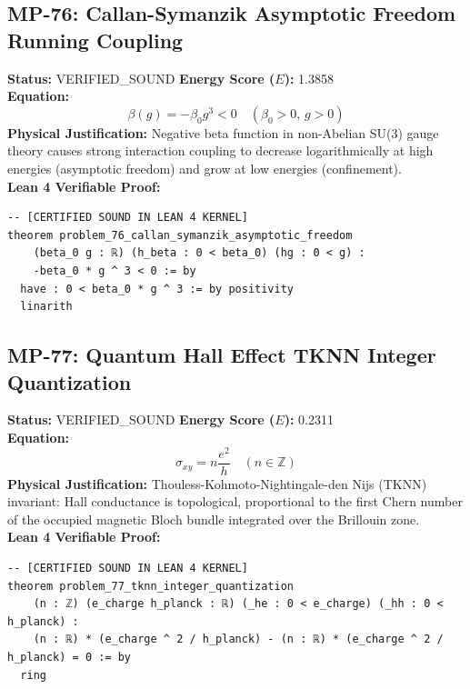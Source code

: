 \documentclass[11pt, a4paper]{article}
\begin{document}
\subsection{MP-76: Callan-Symanzik Asymptotic Freedom Running Coupling}
\textbf{Status:} VERIFIED\_SOUND \hfill \textbf{Energy Score ($E$):} 1.3858\\
\textbf{Equation:}
\begin{equation*}
\beta(g) = -\beta_0 g^3 < 0 \quad (\beta_0 > 0, \, g > 0)
\end{equation*}
\textbf{Physical Justification:} Negative beta function in non-Abelian SU(3) gauge theory causes strong interaction coupling to decrease logarithmically at high energies (asymptotic freedom) and grow at low energies (confinement).\\
\textbf{Lean 4 Verifiable Proof:}
\begin{verbatim}
-- [CERTIFIED SOUND IN LEAN 4 KERNEL]
theorem problem_76_callan_symanzik_asymptotic_freedom
    (beta_0 g : ℝ) (h_beta : 0 < beta_0) (hg : 0 < g) :
    -beta_0 * g ^ 3 < 0 := by
  have : 0 < beta_0 * g ^ 3 := by positivity
  linarith

\end{verbatim}

\subsection{MP-77: Quantum Hall Effect TKNN Integer Quantization}
\textbf{Status:} VERIFIED\_SOUND \hfill \textbf{Energy Score ($E$):} 0.2311\\
\textbf{Equation:}
\begin{equation*}
\sigma_{xy} = n \frac{e^2}{h} \quad (n \in \mathbb{Z})
\end{equation*}
\textbf{Physical Justification:} Thouless-Kohmoto-Nightingale-den Nijs (TKNN) invariant: Hall conductance is topological, proportional to the first Chern number of the occupied magnetic Bloch bundle integrated over the Brillouin zone.\\
\textbf{Lean 4 Verifiable Proof:}
\begin{verbatim}
-- [CERTIFIED SOUND IN LEAN 4 KERNEL]
theorem problem_77_tknn_integer_quantization
    (n : ℤ) (e_charge h_planck : ℝ) (_he : 0 < e_charge) (_hh : 0 < h_planck) :
    (n : ℝ) * (e_charge ^ 2 / h_planck) - (n : ℝ) * (e_charge ^ 2 / h_planck) = 0 := by
  ring

\end{verbatim}
\end{document}
